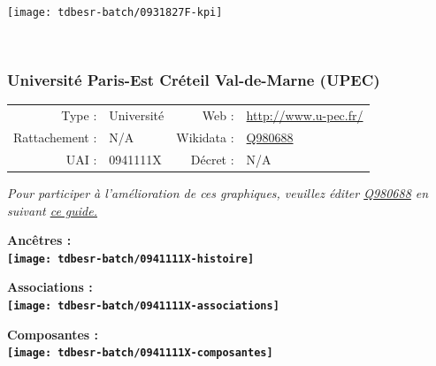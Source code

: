 \documentclass[12pt,french,]{article}
\begin{document}
\begin{center}\texttt{[image: tdbesr-batch/0931827F-kpi]} \end{center}\checkoddpage

\ifoddpage \fi ~\newpage  

\hypertarget{universituxe9-paris-est-cruxe9teil-val-de-marne-upec}{%
\subsubsection{Université Paris-Est Créteil Val-de-Marne
(UPEC)}\label{universituxe9-paris-est-cruxe9teil-val-de-marne-upec}}

\begin{tabular*}{\textwidth}{rp{5cm}rl}  
\hline  
Type : & Université & Web : &\href{http://www.u-pec.fr/}{http://www.u-pec.fr/} \\  
Rattachement : & N/A & Wikidata : & \href{https://www.wikidata.org/entity/Q980688}{Q980688} \\  
UAI : & 0941111X & Décret : & N/A \\  
\hline  
\end{tabular*}

\textit{\scriptsize Pour participer à l'amélioration de ces graphiques, veuillez éditer  \href{https://www.wikidata.org/entity/Q980688}{Q980688}  en suivant \href{https://github.com/cpesr/wikidataESR/blob/master/Rmd/wikidataESR.md}{ce guide.}}

\vspace{1cm}  
\begin{minipage}[b]{0.50\textwidth}\begin{center} \bf Ancêtres : \\  
\texttt{[image: tdbesr-batch/0941111X-histoire]} \end{center}\end{minipage}\begin{minipage}[b]{0.50\textwidth}\begin{center} \bf Associations : \\  
\texttt{[image: tdbesr-batch/0941111X-associations]} \end{center}\end{minipage}

\hrulefill

\begin{center} \bf Composantes : \\  
\texttt{[image: tdbesr-batch/0941111X-composantes]} \end{center}
\end{document}
